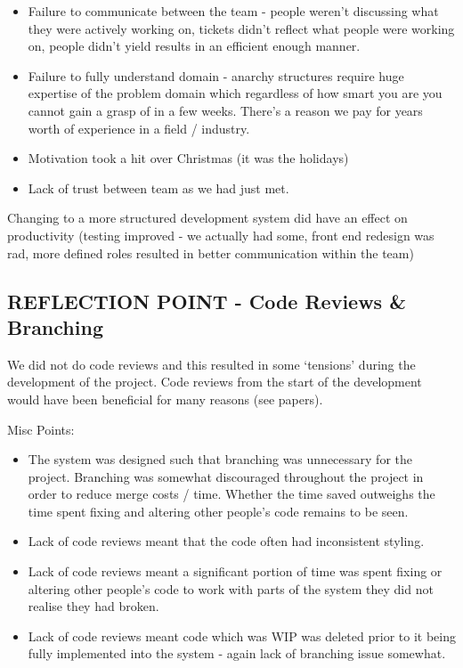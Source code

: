 \documentclass{l3proj}
\begin{document}
\begin{itemize}
\item Failure to communicate between the team - people weren’t discussing what they were actively working on, tickets didn’t reflect what people were working on, people didn’t yield results in an efficient enough manner.
\item Failure to fully understand domain - anarchy structures require huge expertise of the problem domain which regardless of how smart you are you cannot gain a grasp of in a few weeks. There’s a reason we pay for years worth of experience in a field / industry.
\item Motivation took a hit over Christmas (it was the holidays)
\item Lack of trust between team as we had just met.
\end{itemize}

Changing to a more structured development system did have an effect on productivity (testing improved - we actually had some, front end redesign was rad, more defined roles resulted in better communication within the team)


\subsection{REFLECTION POINT - Code Reviews \& Branching}
\label{codereviewbranch}
We did not do code reviews and this resulted in some ‘tensions’ during the development of the project. Code reviews from the start of the development would have been beneficial for many reasons (see papers).

Misc Points:
\begin{itemize}
\item The system was designed such that branching was unnecessary for the project. Branching was somewhat discouraged throughout the project in order to reduce merge costs / time. Whether the time saved outweighs the time spent fixing and altering other people’s code remains to be seen.
\item Lack of code reviews meant that the code often had inconsistent styling.
\item Lack of code reviews meant a significant portion of time was spent fixing or altering other people's code to work with parts of the system they did not realise they had broken.
\item Lack of code reviews meant code which was WIP was deleted prior to it being fully implemented into the system - again lack of branching issue somewhat.
\end{itemize}
\end{document}
